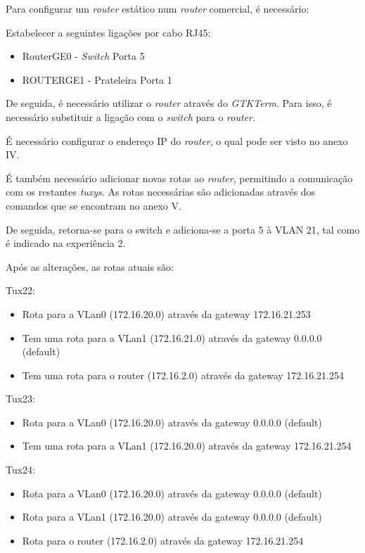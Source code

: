 \documentclass[11pt]{article}
\begin{document}
Para configurar um \textit{router} estático num \textit{router} comercial, é necessário:

Estabelecer a seguintes ligações por cabo RJ45:
\begin{itemize}
\item RouterGE0 - \textit{Switch} Porta 5
\item ROUTERGE1 - Prateleira Porta 1  
\end{itemize}

De seguida, é necessário utilizar o \textit{router} através do \textit{GTKTerm}. Para isso, é necessário substituir a ligação com o \textit{switch} para o \textit{router}.

É necessário configurar o endereço IP do \textit{router}, o qual pode ser visto no anexo IV.

É também necessário adicionar novas rotas ao \textit{router}, permitindo a comunicação com os restantes \textit{tuxys}. As rotas necessárias são adicionadas através dos comandos que se encontram no anexo V.

De seguida, retorna-se para o switch e adiciona-se a porta 5 à VLAN 21, tal como é indicado na experiência 2.

Após as alterações, as rotas atuais são:

Tux22:
\begin{itemize}
\item Rota para a VLan0 (172.16.20.0) através da gateway 172.16.21.253
\item Tem uma rota para a VLan1 (172.16.21.0) através da gateway 0.0.0.0 (default)
\item Tem uma rota para o router (172.16.2.0) através da gateway 172.16.21.254
\end{itemize}

Tux23:
\begin{itemize}
\item Rota para a VLan0 (172.16.20.0) através da gateway 0.0.0.0 (default)
\item Tem uma rota para a VLan1 (172.16.20.0) através da gateway 172.16.21.254
\end{itemize}

Tux24:
\begin{itemize}
\item Rota para a VLan0 (172.16.20.0) através da gateway 0.0.0.0 (default)
\item Rota para a VLan1 (172.16.20.0) através da gateway 0.0.0.0 (default)
\item Rota para o router (172.16.2.0) através da gateway 172.16.21.254
\end{itemize}
\end{document}
